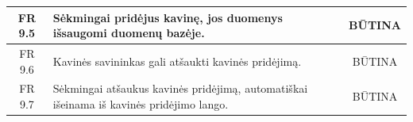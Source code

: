 \documentclass{VUMIFPSkursinis}
\begin{document}
\begin{center}
\begin{table}[H]
\begin{tabular}{|p{2cm}|p{}|p{}|}
	\hline
		\multicolumn{1}{|c|}{FR 9.5}&
		{Sėkmingai pridėjus kavinę, jos duomenys išsaugomi duomenų bazėje.}&
		\multicolumn{1}{|c|}{BŪTINA}\\	

	\hline
		\multicolumn{1}{|c|}{FR 9.6}&
		{Kavinės savininkas gali atšaukti kavinės pridėjimą.}&
		\multicolumn{1}{|c|}{BŪTINA}\\	

	\hline
		\multicolumn{1}{|c|}{FR 9.7}&
		{Sėkmingai atšaukus kavinės pridėjimą, automatiškai išeinama iš kavinės pridėjimo lango.}&
		\multicolumn{1}{|c|}{BŪTINA}\\	

	\hline
	
	
	
	\end{tabular}
	
	\label{table:KavinėsPridėjimas}		
	\end{table}

\end{center}
\end{document}
